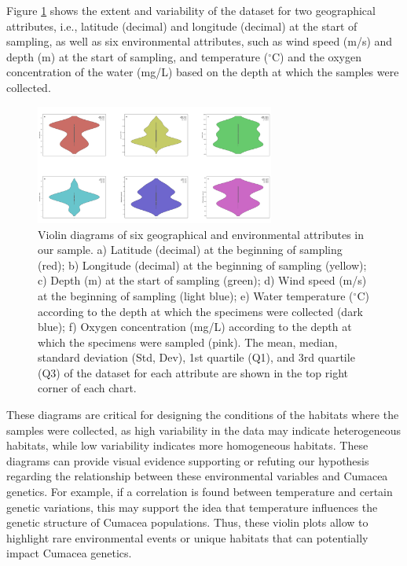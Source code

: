 Figure \ref{fig:fig1} shows the extent and variability of the dataset for two geographical attributes, i.e., latitude (decimal) and longitude (decimal) at the start of sampling, as well as six environmental attributes, such as wind speed (m/s) and depth (m) at the start of sampling, and temperature ($^\circ$C) and the oxygen concentration of the water (mg/L) based on the depth at which the samples were collected.

\begin{figure}[htbp]
    \centering
    \includegraphics[width=0.7\textwidth]{figure1.jpg}
    \caption{Violin diagrams of six geographical and environmental attributes in our sample. a) Latitude (decimal) at the beginning of sampling (red); b) Longitude (decimal) at the beginning of sampling (yellow); c) Depth (m) at the start of sampling (green); d) Wind speed (m/s) at the beginning of sampling (light blue); e) Water temperature ($^\circ$C) according to the depth at which the specimens were collected (dark blue); f) Oxygen concentration (mg/L) according to the depth at which the specimens were sampled (pink). The mean, median, standard deviation (Std, Dev), 1st quartile (Q1), and 3rd quartile (Q3) of the dataset for each attribute are shown in the top right corner of each chart. \label{fig:fig1}}
\end{figure}

These diagrams are critical for designing the conditions of the habitats where the samples were collected, as high variability in the data may indicate heterogeneous habitats, while low variability indicates more homogeneous habitats. These diagrams can provide visual evidence supporting or refuting our hypothesis regarding the relationship between these environmental variables and Cumacea genetics. For example, if a correlation is found between temperature and certain genetic variations, this may support the idea that temperature influences the genetic structure of Cumacea populations. Thus, these violin plots allow to highlight rare environmental events or unique habitats that can potentially impact Cumacea genetics.

